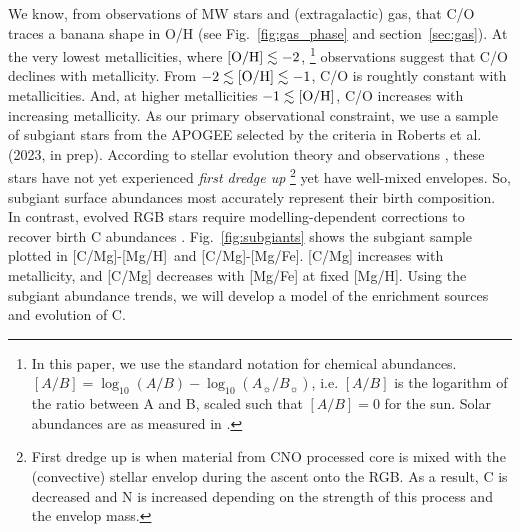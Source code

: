 \documentclass[fleqn,
usenatbib]{mnras}
\newcommand{\apogee}{APOGEE}
\newcommand{\caah}{[C/Mg]-[Mg/H]}
\newcommand{\caafe}{[C/Mg]-[Mg/Fe]}
\begin{document}



We know, from observations of MW stars and (extragalactic) gas, that C/O traces a banana shape in O/H (see Fig.~\ref{fig:gas_phase} and section~\ref{sec:gas}). 
At the very lowest metallicities, where $[{\rm O/H}]\lesssim-2$,%
\footnote{In this paper, we use the standard notation for chemical abundances. $[A/B] = \log_{10}\left(A/B\right) - \log_{10}\left(A_{\sun}/B_{\sun}\right)$, i.e. $[A/B]$ is the logarithm of the ratio between A and B, scaled such that $[A/B]=0$ for the sun. Solar abundances are as measured in \citet{asplund+09}.}
%
observations suggest that C/O declines with metallicity.
From $-2 \lesssim {\rm [O/H]}\lesssim -1$, C/O is roughtly constant with metallicities. 
And, at higher metallicities $-1 \lesssim {\rm [O/H]}$, C/O increases with increasing metallicity.
    As our primary observational constraint, we use a sample of subgiant stars from the \apogee{} \citep{apogee17} selected by the criteria in Roberts et al. (2023, in prep).
    According to stellar evolution theory and observations \citep{gilroy89, korn+07, lind+08, souto+18, souto19}, these stars have not yet experienced \textit{first dredge up}%
\footnote{First dredge up is when material from CNO processed core is mixed with the (convective) stellar envelop during the ascent onto the RGB. As a result, C is decreased and N is increased depending on the strength of this process and the envelop mass.}
yet have well-mixed envelopes. So, subgiant surface abundances most accurately represent their birth composition. 
In contrast, evolved RGB stars require modelling-dependent corrections to recover birth C abundances \citep[e.g.][]{vincenzo+21}. 
Fig.~\ref{fig:subgiants} shows the subgiant sample plotted in \caah\ and \caafe{}. [C/Mg] increases with metallicity, and [C/Mg] decreases with [Mg/Fe] at fixed [Mg/H]. 
Using the subgiant abundance trends, we will develop a model of the enrichment sources and evolution of C.
\end{document}
